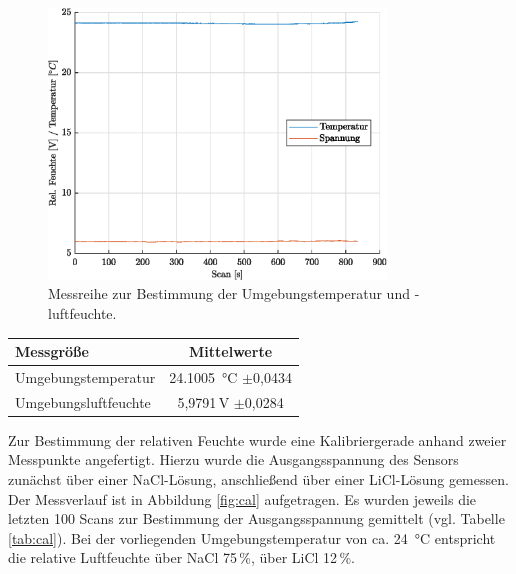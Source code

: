 \begin{figure}[H]
	\centering
	\includegraphics[width=0.8\textwidth]{../DATA/Messreihe_Umgebung.eps}
	\caption[Messreihe Umgebung]{Messreihe zur Bestimmung der Umgebungstemperatur und -luftfeuchte.}
	\label{fig:amb}
\end{figure}

\begin{center}
	\begin{tabular}{l|c}
		\label{tab:amb}
		
		\textbf{Messgröße} & \textbf{Mittelwerte}\\
		\hline
		Umgebungstemperatur & \SI{24,1005}{\celsius} $\pm$0,0434\\
		Umgebungsluftfeuchte & 5,9791\,V $\pm$0,0284
	\end{tabular}
\end{center}

Zur Bestimmung der relativen Feuchte wurde eine Kalibriergerade anhand zweier Messpunkte angefertigt. Hierzu wurde die Ausgangsspannung des Sensors zunächst über einer NaCl-Lösung, anschließend über einer LiCl-Lösung gemessen. Der Messverlauf ist in Abbildung \ref{fig:cal} aufgetragen. Es wurden jeweils die letzten 100 Scans zur Bestimmung der Ausgangsspannung gemittelt (vgl. Tabelle \ref{tab:cal}). Bei der vorliegenden Umgebungstemperatur von ca. \SI{24}{\celsius} entspricht die relative Luftfeuchte über NaCl 75\,\%, über LiCl 12\,\%. 

